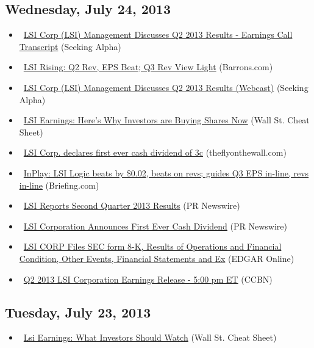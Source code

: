 \documentclass[11pt,asymmetric]{article}
\begin{document}
\subsection*{Wednesday, July 24, 2013}
\begin{itemize}
\item\ \href{http://seekingalpha.com/article/1569682-lsi-corp-lsi-management-discusses-q2-2013-results-earnings-call-transcript?source=yahoo}{LSI Corp (LSI) Management Discusses Q2 2013 Results - Earnings Call Transcript} (Seeking Alpha)
\item\ \href{http://blogs.barrons.com/techtraderdaily/2013/07/24/lsi-rising-q2-rev-eps-beat-q3-rev-view-light/?mod=yahoobarrons}{LSI Rising: Q2 Rev, EPS Beat; Q3 Rev View Light} (Barrons.com)
\item\ \href{http://seekingalpha.com/article/1568262-lsi-corp-lsi-management-discusses-q2-2013-results-webcast?source=yahoo}{LSI Corp (LSI) Management Discusses Q2 2013 Results (Webcast)} (Seeking Alpha)
\item\ \href{http://wallstcheatsheet.com/stocks/lsi-earnings-heres-why-investors-are-buying-shares-now.html/?ref=YF}{LSI Earnings: Here’s Why Investors are Buying Shares Now} (Wall St. Cheat Sheet)
\item\ \href{http://www.theflyonthewall.com/permalinks/entry.php/LSIid1862819/LSI-LSI-Corp-declares-first-ever-cash-dividend-of-c}{LSI Corp. declares first ever cash dividend of 3c} (theflyonthewall.com)
\item\ \href{http://finance.yahoo.com/mp#lsi}{InPlay: LSI Logic beats by \$0.02, beats on revs; guides Q3 EPS in-line, revs in-line} (Briefing.com)
\item\ \href{http://finance.yahoo.com/news/lsi-reports-second-quarter-2013-200200138.html}{LSI Reports Second Quarter 2013 Results} (PR Newswire)
\item\ \href{http://finance.yahoo.com/news/lsi-corporation-announces-first-ever-200100832.html}{LSI Corporation Announces First Ever Cash Dividend} (PR Newswire)
\item\ \href{http://biz.yahoo.com/e/130724/lsi8-k.html}{LSI CORP Files SEC form 8-K, Results of Operations and Financial Condition, Other Events, Financial Statements and Ex} (EDGAR Online)
\item\ \href{http://biz.yahoo.com/research/earncal/20130724.html?t=lsi}{Q2 2013 LSI Corporation Earnings Release - 5:00 pm ET} (CCBN)
\end{itemize}
\subsection*{Tuesday, July 23, 2013}
\begin{itemize}
\item\ \href{http://wallstcheatsheet.com/stocks/lsi-earnings-what-investors-should-watch.html/?ref=YF}{Lsi Earnings: What Investors Should Watch} (Wall St. Cheat Sheet)
\end{itemize}
\end{document}
